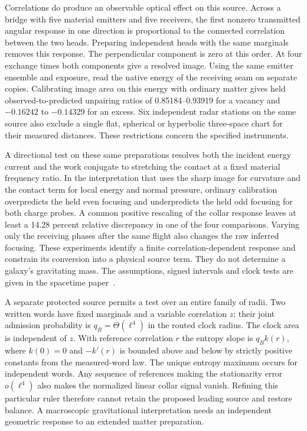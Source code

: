 \documentclass[11pt]{article}
\begin{document}
Correlations do produce an observable optical effect on this source.
Across a bridge with five material emitters and five receivers,
the first nonzero transmitted angular response in one direction
is proportional to the connected correlation between the two
heads. Preparing independent heads with the same marginals removes
this response. The perpendicular component is zero at this order.
At four exchange times both components give a resolved image.
Using the same emitter ensemble and exposure, read the native
energy of the receiving seam on separate copies. Calibrating image
area on this energy with ordinary matter gives held
observed-to-predicted unpairing ratios of 0.85184--0.93919 for a
vacancy and \(-0.16242\) to \(-0.14329\) for an excess. Six independent radar
stations on the same source also exclude a single flat, spherical
or hyperbolic three-space chart for their measured distances.
These restrictions concern the specified instruments.

A directional test on these same preparations resolves both the
incident energy current and the work conjugate to stretching the
contact at a fixed material frequency ratio. In the interpretation
that uses the sharp image for curvature and the contact term for local
energy and normal pressure, ordinary calibration overpredicts the held
even focusing and underpredicts the held odd focusing for both charge
probes. A common positive rescaling of the collar response leaves at
least a 14.28 percent relative discrepancy in one of the four
comparisons. Varying only the receiving phases after the same flight
also changes the raw inferred focusing. These experiments identify a
finite correlation-dependent response and constrain its conversion
into a physical source term. They do not determine a galaxy's
gravitating mass. The assumptions, signed intervals and clock tests
are given in the spacetime paper~\cite{ophEinstein}.

A separate protected source permits a test over an entire family of
radii. Two written words have fixed marginals and a variable
correlation \(z\); their joint admission probability is
\(q_B=\Theta(\ell^4)\) in the routed clock radius. The clock area is
independent of \(z\). With reference correlation \(r\) the entropy
slope is \(q_B k(r)\), where \(k(0)=0\) and \(-k'(r)\) is bounded
above and below by strictly positive constants from the measured-word
law. The unique entropy maximum occurs for independent words. Any
sequence of references making the stationarity error \(o(\ell^4)\)
also makes the normalized linear collar signal vanish. Refining this
particular ruler therefore cannot retain the proposed leading source
and restore balance. A macroscopic gravitational interpretation needs
an independent geometric response to an extended matter preparation.
\end{document}
